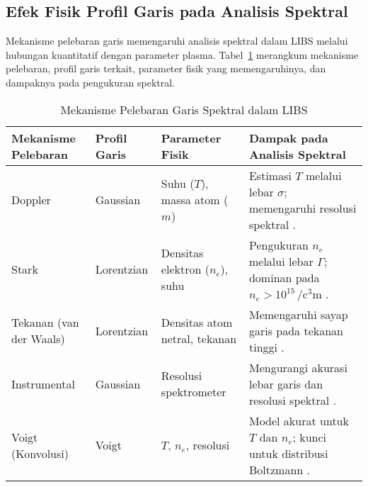 \subsection{Efek Fisik Profil Garis pada Analisis Spektral}
Mekanisme pelebaran garis memengaruhi analisis spektral dalam LIBS melalui hubungan kuantitatif dengan parameter plasma. Tabel~\ref{tab:broadening_effects} merangkum mekanisme pelebaran, profil garis terkait, parameter fisik yang memengaruhinya, dan dampaknya pada pengukuran spektral.

\begin{table}[h]
\centering
\caption{Mekanisme Pelebaran Garis Spektral dalam LIBS}
\label{tab:broadening_effects}
\begin{tabularx}{\textwidth}{XXXX}
\toprule
\textbf{Mekanisme Pelebaran} & \textbf{Profil Garis} & \textbf{Parameter Fisik} & \textbf{Dampak pada Analisis Spektral} \\
\midrule
Doppler & Gaussian & Suhu (\( T \)), massa atom (\( m \)) & Estimasi \( T \) melalui lebar \( \sigma \); memengaruhi resolusi spektral \citep{Demtroder2010}. \\
Stark & Lorentzian & Densitas elektron (\( n_e \)), suhu & Pengukuran \( n_e \) melalui lebar \( \Gamma \); dominan pada \( n_e > 10^{15} \, \si{\per\cubic\centi\meter} \) \citep{Griem1997,Konjevic1999}. \\
Tekanan (van der Waals) & Lorentzian & Densitas atom netral, tekanan & Memengaruhi sayap garis pada tekanan tinggi \citep{Konjevic1999}. \\
Instrumental & Gaussian & Resolusi spektrometer & Mengurangi akurasi lebar garis dan resolusi spektral \citep{Miziolek2006}. \\
Voigt (Konvolusi) & Voigt & \( T \), \( n_e \), resolusi & Model akurat untuk \( T \) dan \( n_e \); kunci untuk distribusi Boltzmann \citep{Aragon2008}. \\
\bottomrule
\end{tabularx}
\end{table}

